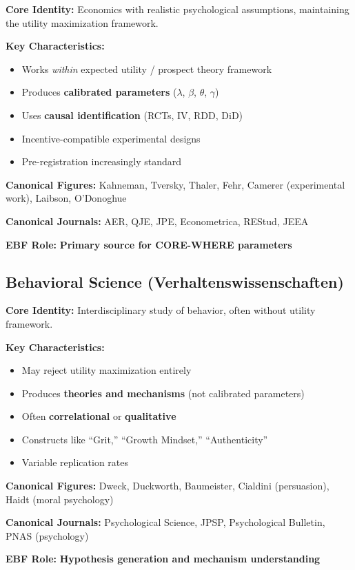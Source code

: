 \documentclass[11pt, a4paper]{article}
\begin{document}
\begin{tcolorbox}[colback=green!5!white, colframe=green!75!black,
    title=Definition: Behavioral Economics]

\textbf{Core Identity:} Economics with realistic psychological assumptions, maintaining the utility maximization framework.

\textbf{Key Characteristics:}
\begin{itemize}[nosep]
    \item Works \textit{within} expected utility / prospect theory framework
    \item Produces \textbf{calibrated parameters} ($\lambda$, $\beta$, $\theta$, $\gamma$)
    \item Uses \textbf{causal identification} (RCTs, IV, RDD, DiD)
    \item Incentive-compatible experimental designs
    \item Pre-registration increasingly standard
\end{itemize}

\textbf{Canonical Figures:}
Kahneman, Tversky, Thaler, Fehr, Camerer (experimental work), Laibson, O'Donoghue

\textbf{Canonical Journals:}
AER, QJE, JPE, Econometrica, REStud, JEEA

\textbf{EBF Role:} \textbf{Primary source for CORE-WHERE parameters}

\end{tcolorbox}

\subsection{Behavioral Science (Verhaltenswissenschaften)}

\begin{tcolorbox}[colback=blue!5!white, colframe=blue!75!black,
    title=Definition: Behavioral Science]

\textbf{Core Identity:} Interdisciplinary study of behavior, often without utility framework.

\textbf{Key Characteristics:}
\begin{itemize}[nosep]
    \item May reject utility maximization entirely
    \item Produces \textbf{theories and mechanisms} (not calibrated parameters)
    \item Often \textbf{correlational} or \textbf{qualitative}
    \item Constructs like ``Grit,'' ``Growth Mindset,'' ``Authenticity''
    \item Variable replication rates
\end{itemize}

\textbf{Canonical Figures:}
Dweck, Duckworth, Baumeister, Cialdini (persuasion), Haidt (moral psychology)

\textbf{Canonical Journals:}
Psychological Science, JPSP, Psychological Bulletin, PNAS (psychology)

\textbf{EBF Role:} \textbf{Hypothesis generation and mechanism understanding}

\end{tcolorbox}
\end{document}
